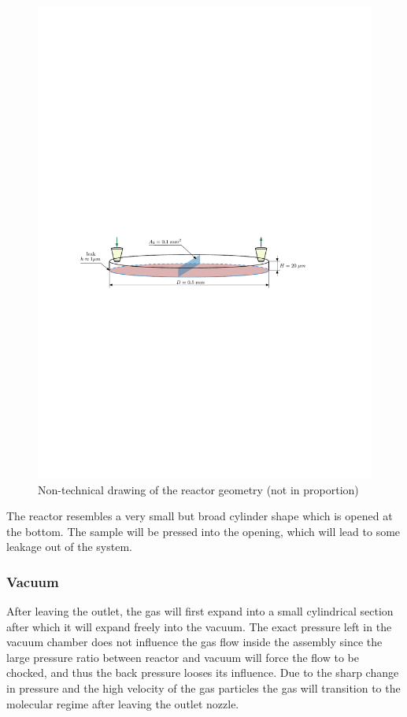 	\begin{figure}[H]
	    \centering
	    \includegraphics[width=\textwidth]{src/03_analytical-work/fig_reactor-geometry.pdf}
	    \caption{Non-technical drawing of the reactor geometry (not in proportion)}
	    \label{fig:geometry-reactor}
	\end{figure}
	The reactor resembles a very small but broad cylinder shape which is opened at the bottom.
	The sample will be pressed into the opening, which will lead to some leakage out of the system.
	\newpage

\subsubsection*{Vacuum}

	After leaving the outlet, the gas will first expand into a small cylindrical section after which it will expand freely into the vacuum.
	The exact pressure left in the vacuum chamber does not influence the gas flow inside the assembly since the large pressure ratio between reactor and vacuum will force the flow to be chocked, and thus the back pressure looses its influence.
	Due to the sharp change in pressure and the high velocity of the gas particles the gas will transition to the molecular regime after leaving the outlet nozzle.
